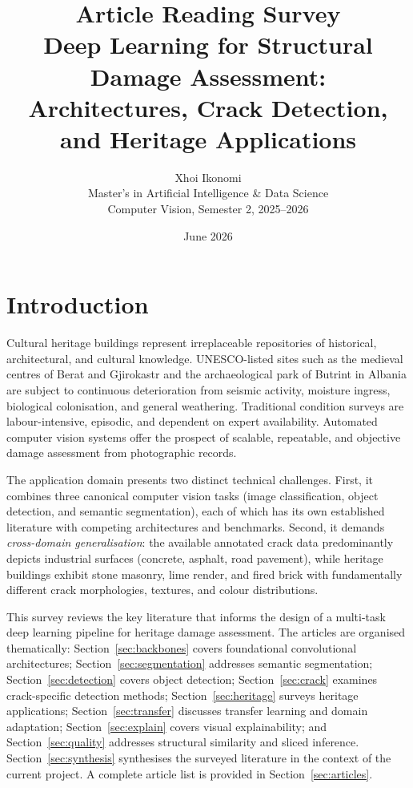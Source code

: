 \documentclass[12pt,a4paper]{article}
\title{%
  \textbf{Article Reading Survey}\\[0.5em]
  \large Deep Learning for Structural Damage Assessment:\\
  Architectures, Crack Detection, and Heritage Applications
}
\author{%
  Xhoi Ikonomi\\[0.2em]
  \small Master's in Artificial Intelligence \& Data Science\\
  \small Computer Vision, Semester 2, 2025--2026
}
\date{June 2026}
\begin{document}
\maketitle
\thispagestyle{fancy}
\newpage

\tableofcontents
\newpage

\section{Introduction}
\label{sec:intro}

Cultural heritage buildings represent irreplaceable repositories of historical, architectural, and cultural knowledge. UNESCO-listed sites such as the medieval centres of Berat and Gjirokastr and the archaeological park of Butrint in Albania are subject to continuous deterioration from seismic activity, moisture ingress, biological colonisation, and general weathering. Traditional condition surveys are labour-intensive, episodic, and dependent on expert availability. Automated computer vision systems offer the prospect of scalable, repeatable, and objective damage assessment from photographic records.

The application domain presents two distinct technical challenges. First, it combines three canonical computer vision tasks (image classification, object detection, and semantic segmentation), each of which has its own established literature with competing architectures and benchmarks. Second, it demands \textit{cross-domain generalisation}: the available annotated crack data predominantly depicts industrial surfaces (concrete, asphalt, road pavement), while heritage buildings exhibit stone masonry, lime render, and fired brick with fundamentally different crack morphologies, textures, and colour distributions.

This survey reviews the key literature that informs the design of a multi-task deep learning pipeline for heritage damage assessment. The articles are organised thematically: Section~\ref{sec:backbones} covers foundational convolutional architectures; Section~\ref{sec:segmentation} addresses semantic segmentation; Section~\ref{sec:detection} covers object detection; Section~\ref{sec:crack} examines crack-specific detection methods; Section~\ref{sec:heritage} surveys heritage applications; Section~\ref{sec:transfer} discusses transfer learning and domain adaptation; Section~\ref{sec:explain} covers visual explainability; and Section~\ref{sec:quality} addresses structural similarity and sliced inference. Section~\ref{sec:synthesis} synthesises the surveyed literature in the context of the current project. A complete article list is provided in Section~\ref{sec:articles}.
\end{document}
